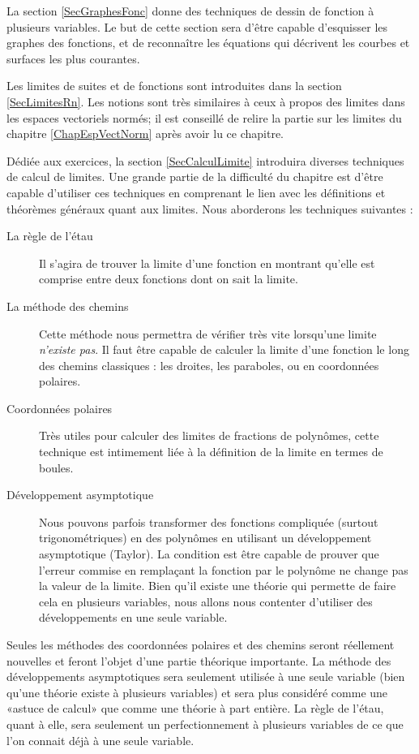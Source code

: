 La section \ref{SecGraphesFonc} donne des techniques de dessin de fonction à plusieurs variables. Le but de cette section sera d'être capable d'esquisser les graphes des fonctions, et de reconnaître les équations qui décrivent les courbes et surfaces les plus courantes.

Les limites de suites et de fonctions sont introduites dans la section \ref{SecLimitesRn}. Les notions sont très similaires à ceux à propos des limites dans les espaces vectoriels normés; il est conseillé de relire la partie sur les limites du chapitre \ref{ChapEspVectNorm} après avoir lu ce chapitre.

Dédiée aux exercices, la section \ref{SecCalculLimite} introduira diverses techniques de calcul de limites. Une grande partie de la difficulté du chapitre est d'être capable d'utiliser ces techniques en comprenant le lien avec les définitions et théorèmes généraux quant aux limites. Nous aborderons les techniques suivantes :
\begin{description}
	\item[La règle de l'étau] Il s'agira de trouver la limite d'une fonction en montrant qu'elle est comprise entre deux fonctions dont on sait la limite.
	\item[La méthode des chemins] Cette méthode nous permettra de vérifier très vite lorsqu'une limite \emph{n'existe pas}. Il faut être capable de calculer la limite d'une fonction le long des chemins classiques : les droites, les paraboles, ou en coordonnées polaires.
	\item[Coordonnées polaires] Très utiles pour calculer des limites de fractions de polynômes, cette technique est intimement liée à la définition de la limite en termes de boules.
	\item[Développement asymptotique] Nous pouvons parfois transformer des fonctions compliquée (surtout trigonométriques) en des polynômes en utilisant un développement asymptotique (Taylor). La condition est être capable de prouver que l'erreur commise en remplaçant la fonction par le polynôme ne change pas la valeur de la limite. Bien qu'il existe une théorie qui permette de faire cela en plusieurs variables, nous allons nous contenter d'utiliser des développements en une seule variable. 

\end{description}
Seules les méthodes des coordonnées polaires et des chemins seront réellement nouvelles et feront l'objet d'une partie théorique importante. La méthode des développements asymptotiques sera seulement utilisée à une seule variable (bien qu'une théorie existe à plusieurs variables) et sera plus considéré comme une «astuce de calcul» que comme une théorie à part entière. La règle de l'étau, quant à elle, sera seulement un perfectionnement à plusieurs variables de ce que l'on connait déjà à une seule variable.


